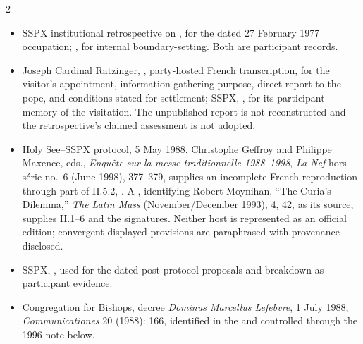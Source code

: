 \begin{multicols}{2}
{\footnotesize
\begin{itemize}[itemsep=0.1em,topsep=0.15em]
\item SSPX institutional retrospective on , for the dated 27 February 1977 occupation; , for internal boundary-setting. Both are participant records.
\item Joseph Cardinal Ratzinger, , party-hosted French transcription, for the visitor's appointment, information-gathering purpose, direct report to the pope, and conditions stated for settlement; SSPX, , for its participant memory of the visitation. The unpublished report is not reconstructed and the retrospective's claimed assessment is not adopted.
\item Holy See--SSPX protocol, 5 May 1988. Christophe Geffroy and Philippe Maxence, eds., \emph{Enquête sur la messe traditionnelle 1988--1998}, \emph{La Nef} hors-série no.~6 (June 1998), 377--379, supplies an incomplete French reproduction through part of II.5.2, . A , identifying Robert Moynihan, “The Curia's Dilemma,” \emph{The Latin Mass} (November/December 1993), 4, 42, as its source, supplies II.1--6 and the signatures. Neither host is represented as an official edition; convergent displayed provisions are paraphrased with provenance disclosed.
\item SSPX, , used for the dated post-protocol proposals and breakdown as participant evidence.
\item Congregation for Bishops, decree \emph{Dominus Marcellus Lefebvre}, 1 July 1988, \emph{Communicationes} 20 (1988): 166, identified in the  and controlled through the 1996 note below.

\end{itemize}}
\end{multicols}
